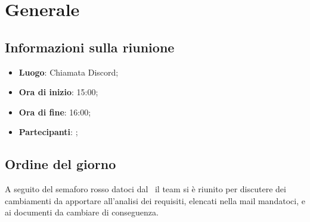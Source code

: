 \section{Generale}

\vspace{10pt}


\subsection{Informazioni sulla riunione}
\begin{itemize}
	\item \textbf{Luogo}: Chiamata Discord;
	\item \textbf{Ora di inizio}: 15:00;
	\item \textbf{Ora di fine}: 16:00;
	\item \textbf{Partecipanti}: \team;
\end{itemize}

\vspace{5pt}

\subsection{Ordine del giorno}
A seguito del semaforo rosso datoci dal \commitNameS\ il team si è riunito per discutere dei cambiamenti da apportare all'analisi dei requisiti, elencati nella mail mandatoci, e ai documenti da cambiare di conseguenza.

